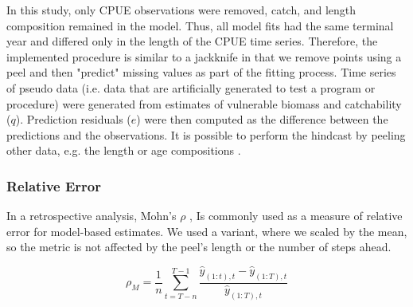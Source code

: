\documentclass[11pt,a4paper]{article}
\begin{document}
{In this study, only CPUE observations were removed, catch, and length composition remained in the model. Thus, all model fits had the same terminal year and differed only in the length of the CPUE time series. Therefore, the implemented procedure is similar to a jackknife in that we remove points using a peel and then "predict" missing values as part of the fitting process. Time series of pseudo data (i.e. data that are artificially generated to test a program or procedure) were generated from estimates of vulnerable biomass and catchability ($q$). Prediction residuals ($e$) were then computed as the difference between the predictions and the observations. It is possible to perform the hindcast by peeling other data, e.g. the length or age compositions \citep[see][]{carvalho2020cookbook}.


\subsubsection{Relative Error}
 
In a retrospective analysis, Mohn's $\rho$ \citep{mohn1999retrospective}, Is commonly used as a measure of relative error for model-based estimates. We used a variant, where we scaled by the mean, so the metric is not affected by the peel's length or the number of steps ahead.

\begin{equation}
\label{eqn:mohn}
\rho_{M} = \frac{1}{n} \sum_{t=T-n}^{T-1} \frac{\hat{y}_{(1:t),t}-\hat{y}_{(1:T),t}}{\hat{y}_{(1:T),t}} 
\end{equation}

}
\end{document}
